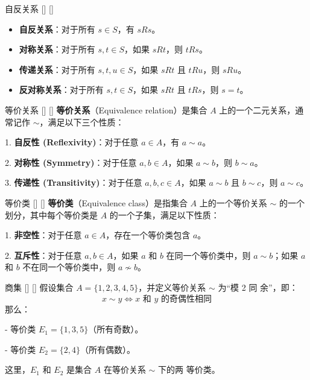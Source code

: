 \documentclass[UTF8]{ctexart}
\begin{document}
		\begin{ppt}
            []
            {自反关系}
            []
            []
			\hspace{1cm}
			\begin{itemize}
				\item \textbf{自反关系}：对于所有 \( s \in S \)，有 \( sRs \)。
				\item \textbf{对称关系}：对于所有 \( s, t \in S \)，如果 \( sRt \)，则 \( tRs \)。
				\item \textbf{传递关系}：对于所有 \( s, t, u \in S \)，如果 \( sRt \) 且 \( tRu \)，则 \( sRu \)。
				\item \textbf{反对称关系}：对于所有 \( s, t \in S \)，如果 \( sRt \) 且 \( tRs \)，则 \( s = t \)。
			\end{itemize}			
		\end{ppt}

        \begin{dfn}
            []
            {等价关系}
            []
            []
            \textbf{等价关系}（Equivalence relation）是集合 \( A \) 上的一个二元关系，通常记作 \(\sim\)，满足以下三个性质：

            1. \textbf{自反性 (Reflexivity)}：对于任意 \( a \in A \)，有 \( a \sim a \)。
            
            2. \textbf{对称性 (Symmetry)}：对于任意 \( a, b \in A \)，如果 \( a \sim b \)，则 \( b \sim a \)。
            
            3. \textbf{传递性 (Transitivity)}：对于任意 \( a, b, c \in A \)，如果 \( a \sim b \) 且 \( b \sim c \)，则 \( a \sim c \)。
        \end{dfn}

        \begin{dfn}
            []
            {等价类}
            []
            []
                \textbf{等价类}（Equivalence class）是指集合 \( A \) 上的一个等价关系 \( \sim \) 的一个划分，其中每个等价类是 \( A \) 的一个子集，满足以下性质：

            1. \textbf{非空性}：对于任意 \( a \in A \)，存在一个等价类包含 \( a \)。

            2. \textbf{互斥性}：对于任意 \( a, b \in A \)，如果 \( a \) 和 \( b \) 在同一个等价类中，则 \( a \sim b \)；如果 \( a \) 和 \( b \) 不在同一个等价类中，则 \( a \not\sim b \)。
        \end{dfn}

        \begin{xmp}
            []
            {商集}
            []
            []
                假设集合 \( A = \{1, 2, 3, 4, 5\} \)，并定义等价关系 \( \sim \) 为“模 2 同
            余”，即：
            \[
            x \sim y \iff x \text{ 和 } y \text{ 的奇偶性相同}
            \]
                那么：

            - 等价类 \( E_1 = \{1, 3, 5\} \)（所有奇数）。

            - 等价类 \( E_2 = \{2, 4\} \)（所有偶数）。

                这里，\( E_1 \) 和 \( E_2 \) 是集合 \( A \) 在等价关系 \( \sim \) 下的两
            等价类。
        \end{xmp}
\end{document}
